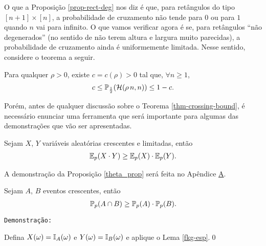 \par O que a Proposição \ref{prop-rect-deg} nos diz é que, para retângulos do tipo $[n + 1] \times [n]$, a probabilidade de cruzamento não tende para $0$ ou para $1$ quando $n$ vai para infinito. O que vamos verificar agora é se, para retângulos ``não degenerados'' (no sentido de não terem altura e largura muito parecidas), a probabilidade de cruzamento ainda é uniformemente limitada. Nesse sentido, considere o teorema a seguir.
\begin{mythm} \label{thm-crossing-bound}
	Para qualquer $\rho > 0$, existe $c = c(\rho) > 0$ tal que, $\forall n \geq 1$, 
	\begin{align*}
		c \leq \operatorname{\mathbb{P}}_{\frac{1}{2}}(\operatorname{\mathcal{H}}(\rho\,n, n)) \leq 1-c.
	\end{align*}
\end{mythm}

\par Porém, antes de qualquer discussão sobre o Teorema \ref{thm-crossing-bound}, é necessário enunciar uma ferramenta que será importante para algumas das demonstrações que vão ser apresentadas.
\begin{mylem} \label{fkg-esp}
	Sejam $X$, $Y$ variáveis aleatórias crescentes e limitadas, então
	\begin{align*}
		\operatorname{\mathbb{E}}_p(X \cdot Y) \geq \operatorname{\mathbb{E}}_p(X) \cdot \operatorname{\mathbb{E}}_p(Y).
	\end{align*}
\end{mylem}
\par A demonstração da Proposição \ref{theta_prop} será feita no Apêndice \hyperref[apendice-primeiro]{A}.

\begin{mycol} \label{fkg}
	Sejam $A$, $B$ eventos crescentes, então
	\begin{align*}
		\operatorname{\mathbb{P}}_p(A \cap B) \geq \operatorname{\mathbb{P}}_p(A) \cdot \operatorname{\mathbb{P}}_p(B).
	\end{align*}
\end{mycol}

\par \texttt{Demonstração:}

\par Defina $X(\omega) = \operatorname{\mathbb{I}}_{A}(\omega)$ e $Y(\omega) = \operatorname{\mathbb{I}}_{B}(\omega)$ e aplique o Lema \ref{fkg-esp}.\hspace{\fill}\qed

\vspace{6pt}

